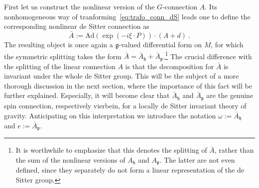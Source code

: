 \documentclass[11pt]{article}
\begin{document}
First let us construct the nonlinear version of the 
$G$-connection $A$. Its nonhomogeneous way of 
tranforming~\eqref{eq:trafo_conn_dS} leads one to define the 
corresponding nonlinear de Sitter connection as
%
\begin{equation}
	\label{eq:A_nonlin}
	\bar{A} := \mathrm{Ad}(\exp(-i\xi\cdot P))\cdot(A + d)~.
\end{equation}
The resulting object is once again a $\mathfrak{g}$-valued 
differential form on $M$, for which the symmetric splitting takes 
the form $\bar{A} =\bar{A}_\mathfrak{h} + 
\bar{A}_\mathfrak{p}$.\footnote{It is worthwhile to emphasize 
	that this denotes the splitting of $\bar{A}$, rather than the 
	sum of the nonlinear versions of $A_\mathfrak{h}$ and 
	$A_\mathfrak{p}$. The latter are not even defined, since they 
	separately do not form a linear representation of the de 
	Sitter group.}
The crucial difference with the splitting of the linear 
connection $A$ is that the decomposition for $\bar{A}$ is 
invariant under the whole de Sitter group. This will be the 
subject of a more thorough discussion in the next section, where 
the importance of this fact will be further explained.  
Especially, it will become clear that $\bar{A}_\mathfrak{h}$ and 
$\bar{A}_\mathfrak{p}$ are the genuine spin connection, 
respectively vierbein, for a locally de Sitter invariant theory 
of gravity. Anticipating on this interpretation we introduce the 
notation $\omega := \bar{A}_\mathfrak{h}$ and $e := 
\bar{A}_\mathfrak{p}$.
\end{document}
